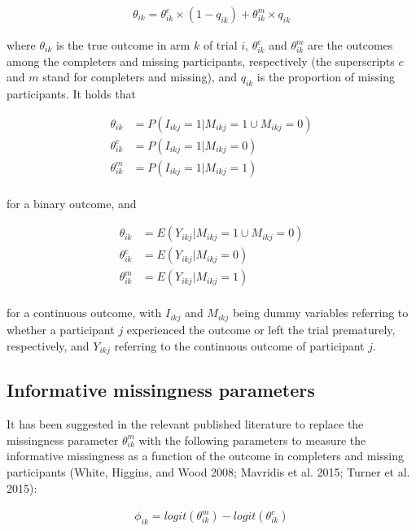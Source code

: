 \[\begin{aligned}
\theta_{ik} = \theta^{c}_{ik} \times (1 - q_{ik}) + \theta^{m}_{ik} \times q_{ik}
\end{aligned}\]

where \(\theta_{ik}\) is the true outcome in arm \(k\) of trial \(i\), \(\theta^{c}_{ik}\)
and \(\theta^{m}_{ik}\) are the outcomes among the completers and missing participants,
respectively (the superscripts \(c\) and \(m\) stand for completers and missing), and
\(q_{ik}\) is the proportion of missing participants. It holds that

\[\begin{aligned}
\theta_{ik} &= P(I_{ikj} = 1 | M_{ikj} = 1 \cup M_{ikj} = 0) \\
\theta^{c}_{ik} &= P(I_{ikj} = 1 | M_{ikj} = 0) \\
\theta^{m}_{ik} &= P(I_{ikj} = 1 | M_{ikj} = 1) \\
\end{aligned}\]

for a binary outcome, and

\[\begin{aligned}
\theta_{ik} &= E(Y_{ikj} | M_{ikj} = 1 \cup M_{ikj} = 0) \\
\theta^{c}_{ik} &= E(Y_{ikj} | M_{ikj} = 0) \\
\theta^{m}_{ik} &= E(Y_{ikj} | M_{ikj} = 1) \\
\end{aligned}\]

for a continuous outcome, with \(I_{ikj}\) and \(M_{ikj}\) being dummy variables
referring to whether a participant \(j\) experienced the outcome or left the trial
prematurely, respectively, and \(Y_{ikj}\) referring to the continuous outcome of
participant \(j\).

\hypertarget{informative-missingness-parameters}{%
\subsection{Informative missingness parameters}\label{informative-missingness-parameters}}

It has been suggested in the relevant published literature to replace the missingness
parameter \(\theta^{m}_{ik}\) with the following parameters to measure the informative
missingness as a function of the outcome in completers and missing participants
(White, Higgins, and Wood 2008; Mavridis et al. 2015; Turner et al. 2015):

\[\begin{aligned}
\phi_{ik} = logit(\theta^{m}_{ik}) - logit(\theta^{c}_{ik})
\end{aligned}\]

